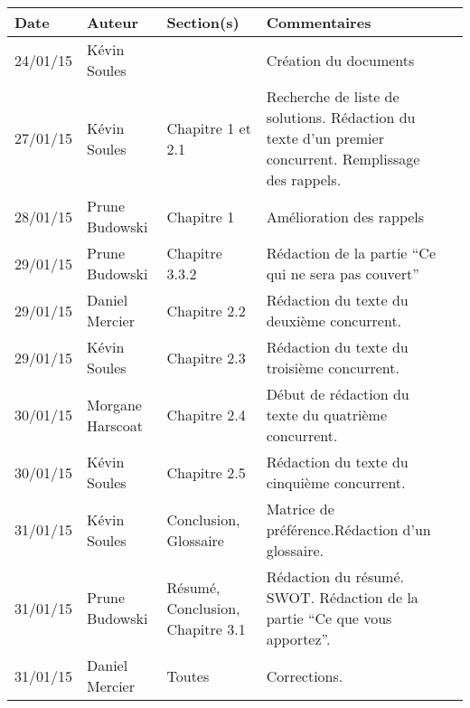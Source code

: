 \small
\begin{tabular}{|p{1.5cm}|l|p{2.5cm}|p{7.8cm}|l|}
  \hline
 
   \rowcolor{Gainsboro}Date  & Auteur & Section(s) & Commentaires \\
  \hline
24/01/15 & Kévin Soules &  & Création du documents\\
  \hline
27/01/15 & Kévin Soules & Chapitre 1 et 2.1 & Recherche de liste de solutions. Rédaction du texte d'un premier concurrent. Remplissage des rappels.\\
\hline
28/01/15 & Prune Budowski & Chapitre 1 & Amélioration des rappels \\
\hline
29/01/15 & Prune Budowski & Chapitre 3.3.2 & Rédaction de la partie ``Ce qui ne sera pas couvert''\\
\hline
29/01/15 & Daniel Mercier & Chapitre 2.2 & Rédaction du texte du deuxième concurrent.\\
\hline
29/01/15 & Kévin Soules & Chapitre 2.3 & Rédaction du texte du troisième concurrent. \\
\hline
30/01/15 & Morgane Harscoat & Chapitre 2.4 & Début de rédaction du texte du quatrième concurrent. \\
\hline
30/01/15 & Kévin Soules & Chapitre 2.5 & Rédaction du texte du cinquième concurrent.\\
\hline
31/01/15 & Kévin Soules & Conclusion, Glossaire & Matrice de préférence.Rédaction d'un glossaire. \\
\hline
31/01/15 & Prune Budowski & Résumé, Conclusion, Chapitre 3.1 & Rédaction du résumé. SWOT. Rédaction de la partie ``Ce que vous apportez''.  
  \\
\hline
31/01/15 & Daniel Mercier & Toutes & Corrections.
\\
  \hline
\end{tabular}
\normalsize
